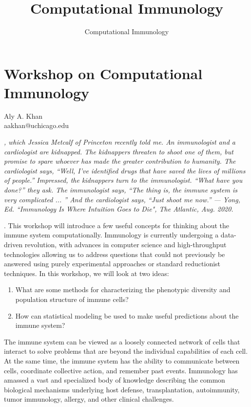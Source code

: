 \documentclass{tufte-book}\usepackage[]{graphicx}\usepackage[]{xcolor}
\title{Computational Immunology} %
\author[Computational Immunology]{Computational Immunology} %
\begin{document}
\chapter{Workshop on Computational Immunology}
\Large Aly A. Khan \\
\noindent aakhan@uchicago.edu
\begin{fullwidth}

\itshape \normalsize {}, which Jessica Metcalf of Princeton recently told me. An immunologist and a cardiologist are kidnapped. The kidnappers threaten to shoot one of them, but promise to spare whoever has made the greater contribution to humanity. The cardiologist says, “Well, I’ve identified drugs that have saved the lives of millions of people.” Impressed, the kidnappers turn to the immunologist. “What have you done?” they ask. The immunologist says, “The thing is, the immune system is very complicated ... ” And the cardiologist says, “Just shoot me now.” \textnormal{\normalsize {--- Yong, Ed. “Immunology Is Where Intuition Goes to Die", The Atlantic, Aug. 2020.}}


\end{fullwidth}

. This workshop will introduce a few useful concepts for thinking about the immune system computationally. Immunology is currently undergoing a data-driven revolution, with advances in computer science and high-throughput technologies allowing us to address questions that could not previously be answered using purely experimental approaches or standard reductionist techniques. In this workshop, we will look at two ideas:

\begin{enumerate}
  \item What are some methods for characterizing the phenotypic diversity and population structure of immune cells?
  \item How can statistical modeling be used to make useful predictions about the immune system?
\end{enumerate}

 The immune system can be viewed as a loosely connected network of cells that interact to solve problems that are beyond the individual capabilities of each cell. At the same time, the immune system has the ability to communicate between cells, coordinate collective action, and remember past events. Immunology has amassed a vast and specialized body of knowledge describing the common biological mechanisms underlying host defense, transplantation, autoimmunity, tumor immunology, allergy, and other clinical challenges.
\end{document}
